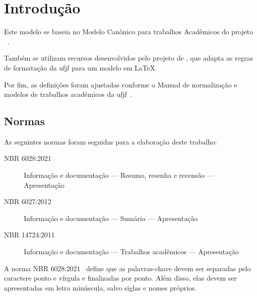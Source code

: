 \chapter{Introdução}%
\label{cap:introducao}

Este modelo se baseia no Modelo Canônico para trabalhos Acadêmicos do projeto \abnTeX~\cite{abntex2:2024}.

Também se utilizam recursos desenvolvidos pelo projeto de , que adapta as regras de formatação da \gls{ufjf} para um modelo em \LaTeX.

Por fim, as definições foram ajustadas conforme o Manual de normalização e modelos de trabalhos acadêmicos da \gls{ufjf}~\cite{cdd:2023}.

\section{Normas}%
\label{sec:normas}

As seguintes normas foram seguidas para a elaboração deste trabalho:

\begin{description}
    \item[NBR 6028:2021] Informação e documentação --- Resumo, resenha e recensão --- Apresentação~\cite{nbr6028:2021}
    \item[NBR 6027:2012] Informação e documentação --- Sumário --- Apresentação~\cite{nbr6027:2012}
    \item[NBR 14724:2011] Informação e documentação --- Trabalhos acadêmicos --- Apresentação~\cite{nbr14724:2011}
\end{description}

A norma NBR 6028:2021~\cite{nbr6028:2021} define que as palavras-chave devem ser separadas pelo caractere ponto e vírgula e finalizadas por ponto.
Além disso, elas devem ser apresentadas em letra minúscula, salvo siglas e nomes próprios.
